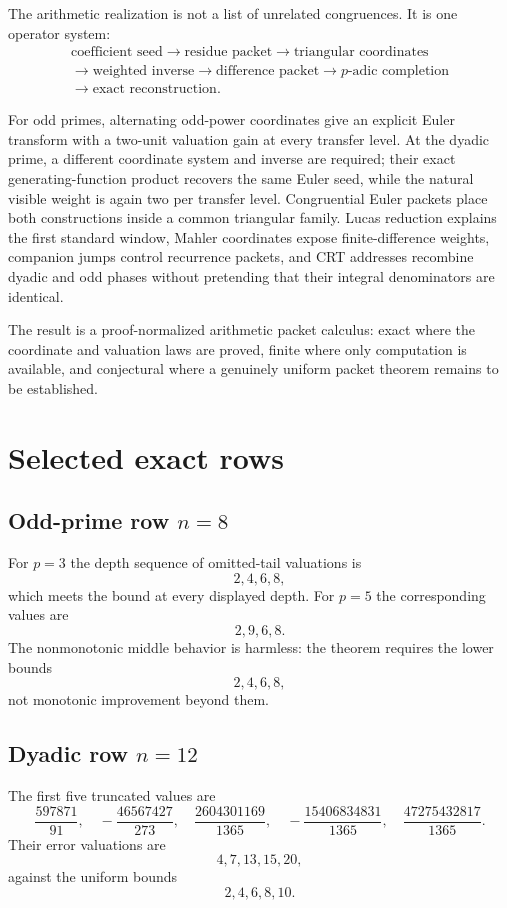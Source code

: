 \documentclass[11pt]{article}
\theoremstyle{definition}
\theoremstyle{remark}
\begin{document}
The arithmetic realization is not a list of unrelated congruences. It is one operator system:
\[
\boxed{
\begin{gathered}
\text{coefficient seed}
\longrightarrow
\text{residue packet}
\longrightarrow
\text{triangular coordinates}\\
\longrightarrow
\text{weighted inverse}
\longrightarrow
\text{difference packet}
\longrightarrow
\text{$p$-adic completion}\\
\longrightarrow
\text{exact reconstruction}.
\end{gathered}}
\]

For odd primes, alternating odd-power coordinates give an explicit Euler transform with a two-unit valuation gain at every transfer level. At the dyadic prime, a different coordinate system and inverse are required; their exact generating-function product recovers the same Euler seed, while the natural visible weight is again two per transfer level. Congruential Euler packets place both constructions inside a common triangular family. Lucas reduction explains the first standard window, Mahler coordinates expose finite-difference weights, companion jumps control recurrence packets, and CRT addresses recombine dyadic and odd phases without pretending that their integral denominators are identical.

The result is a proof-normalized arithmetic packet calculus: exact where the coordinate and valuation laws are proved, finite where only computation is available, and conjectural where a genuinely uniform packet theorem remains to be established.

\appendix
\section{Selected exact rows}

\subsection{Odd-prime row \texorpdfstring{$n=8$}{n=8}}
For $p=3$ the depth sequence of omitted-tail valuations is
\[
2,4,6,8,
\]
which meets the bound at every displayed depth. For $p=5$ the corresponding values are
\[
2,9,6,8.
\]
The nonmonotonic middle behavior is harmless: the theorem requires the lower bounds
\[
2,4,6,8,
\]
not monotonic improvement beyond them.

\subsection{Dyadic row \texorpdfstring{$n=12$}{n=12}}
The first five truncated values are
\[
\frac{597871}{91},
\quad
-\frac{46567427}{273},
\quad
\frac{2604301169}{1365},
\quad
-\frac{15406834831}{1365},
\quad
\frac{47275432817}{1365}.
\]
Their error valuations are
\[
4,7,13,15,20,
\]
against the uniform bounds
\[
2,4,6,8,10.
\]
\end{document}
